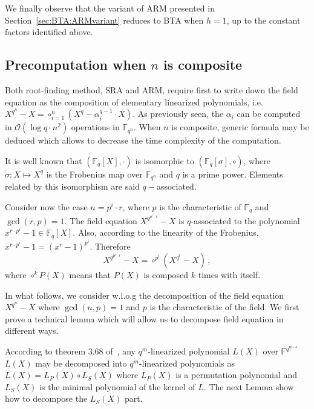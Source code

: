 \documentclass{sig-alternate}
\newcommand{\qq}{q}
\begin{document}
We finally observe that the variant of ARM presented in Section~\ref{sec:BTA:ARMvariant} reduces to BTA when $h=1$, up to the constant factors identified above.





\subsection{Precomputation when $n$ is composite}

\noindent Both root-finding method, SRA and ARM, require first to write down the field equation as the composition of elementary linearized polynomials, i.e. $X^{q^n}-X=\circ_{i=1}^n (X^q-\alpha_i^{q-1} \cdot X)$.
As previously seen, the $\alpha_i$ can be computed in $\mathcal{O}(\log q \cdot n^2)$ operations in $\mathbb{F}_{q^n}$. When $n$ is composite, generic formula may be deduced 
which allows to decrease the time complexity of the computation.

\medskip   

\noindent It is well known that $(\mathbb{F}_q[X],\cdot)$ is isomorphic to  $(\mathbb{F}_q[\sigma], \circ)$, where $\sigma: X \mapsto X^q$ is the Frobenius map over $\mathbb{F}_{q^n}$  and $q$ is a prime power. 
Elements related by this isomorphism are said $q-$associated. 

\medskip

\noindent Consider now the case $n=p^i \cdot r$, where $p$ is the characteristic of $\mathbb{F}_q$ and $\gcd(r,p)=1$.  
The field equation $X^{q^{p^i \cdot r}}-X$ is $q$-associated to the polynomial $x^{r\cdot p^i}-1 \in \mathbb{F}_q[X]$. Also, according
 to the linearity of the Frobenius,  $x^{r \cdot p^i}-1=(x^r-1)^{p^i}$. Therefore 
$$X^{q^{p^i \cdot r}}-X=\circ^{p^i} (X^{q^r}-X)\,,$$
where $\circ^{k} P(X)$ means that $P(X)$ is composed $k$ times with itself. 

\medskip

\noindent In what follows, we consider w.l.o.g the decomposition of the field equation $X^{\qq^n}-X$ where $\gcd(n,p)=1$ and $p$ is the characteristic of the field. We first prove a technical lemma which will allow us to decompose field equation in different ways.

\medskip

According to theorem 3.68 of~\cite{LildNiderreiter}, any $\qq^m$-linearized polynomial $L(X)$ over $\mathbb{F}^{\qq^{m \cdot s}}$ $L(X)$ may be decomposed into $\qq^m$-linearized polynomials as $L(X)=L_P(X) \circ L_S(X)$ where $L_P(X)$ is a permutation  polynomial and $L_S(X)$ is the minimal polynomial of the kernel of $L$. The next Lemma show how to decompose the $L_S(X)$ part.
\end{document}
